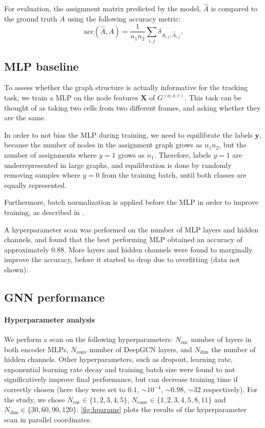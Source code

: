 \documentclass[10pt,conference,compsocconf,a4paper]{IEEEtran}
\renewcommand{\vec}[1]{\boldsymbol{#1}}
\newcommand*{\shortautoref}[1]{%
	\begingroup
	\def\equationautorefname{\textsc{Eq.}}%
	\def\tableautorefname{\textsc{Tab.}}%
	\def\figureautorefname{\textsc{Fig.}}%
	\autoref{#1}%
	\endgroup
}
\begin{document}
	For evaluation, the assignment matrix predicted by the model, $\hat A$ is compared to the ground truth $A$ using the following accuracy metric:
	$$
		\textrm{acc}(\hat A, A) = \frac{1}{n_1 n_2} \sum_{i,j} \delta_{A_{i,j}, \hat{A}_{i,j}}.
	$$

	\subsection{MLP baseline}

		To assess whether the graph structure is actually informative for the tracking task, we train a MLP on the node features $\vec{X}$ of $G^{(a;x,e)}$. This task can be thought of as taking two cells from two different frames, and asking whether they are the same.


		In order to not bias the MLP during training, we need to equilibrate the labels $\vec{y}$, because the number of nodes in the assignment graph grows as $n_1 n_2$, but the number of assignments where $y=1$ grows as $n_1$. Therefore, labels $y=1$ are underrepresented in large graphs, and equilibration is done by randomly removing samples where $y=0$ from the training batch, until both classes are equally represented.

		Furthermore, batch normalization is applied before the MLP in order to improve training, as described in \cite{ioffe_batch_2015}.

		A hyperparameter scan was performed on the number of MLP layers and hidden channels, and found that the best performing MLP obtained an accuracy of approximately $0.88$. More layers and hidden channels were found to marginally improve the accuracy, before it started to drop due to overfitting (data not shown).

	\subsection{GNN performance}

		\paragraph*{Hyperparameter analysis} We perform a scan on the following hyperparameters: $N_\textrm{enc}$ number of layers in both encoder MLPs, $N_\textrm{conv}$ number of DeepGCN layers, and $N_\textrm{dim}$ the number of hidden channels. Other hyperparameters, such as dropout, learning rate, exponential learning rate decay and training batch size were found to not significatively improve final performance, but can decrease training time if correctly chosen (here they were set to $0.1$, $\sim 10^{-4}$, $\sim 0.98$, $\sim 32$ respectively). For the study, we chose $N_\textrm{enc} \in \{1,2,3,4,5\}$, $N_\textrm{conv} \in \{1,2,3,4,5,8,11\}$ and $N_\textrm{dim} \in \{30, 60, 90, 120\}$. \shortautoref{fig:hparams} plots the results of the hyperparameter scan in parallel coordinates.
\end{document}
